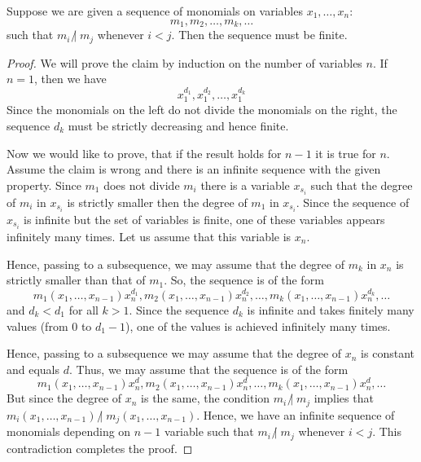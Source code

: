 \begin{claim}
Suppose we are given a sequence of monomials on variables $x_1,\ldots,x_n$:
\[
m_1,m_2,\ldots, m_k,\ldots
\]
such that $m_i \mathbin{\not|} m_j$ whenever $i < j$.
Then the sequence must be finite.
\end{claim}
\begin{proof}
We will prove the claim by induction on the number of variables $n$.
If $n = 1$, then we have
\[
x_1^{d_1}, x_1^{d_2},\ldots, x_1^{d_k}
\]
Since the monomials on the left do not divide the monomials on the right, the sequence $d_k$ must be strictly decreasing and hence finite.

Now we would like to prove, that if the result holds for $n-1$ it is true for $n$.
Assume the claim is wrong and there is an infinite sequence with the given property.
Since $m_1$ does not divide $m_i$ there is a variable $x_{s_i}$ such that the degree of $m_i$ in $x_{s_i}$ is strictly smaller then the degree of $m_1$ in $x_{s_i}$.
Since the sequence of $x_{s_i}$ is infinite but the set of variables is finite, one of these variables appears infinitely many times.
Let us assume that this variable is $x_n$.

Hence, passing to a subsequence, we may assume that the degree of $m_k$ in $x_n$ is strictly smaller than that of $m_1$.
So, the sequence is of the form
\[
m_1(x_1,\ldots,x_{n-1})x_n^{d_1}, m_2(x_1,\ldots,x_{n-1})x_n^{d_2},\ldots, m_k(x_1,\ldots,x_{n-1})x_n^{d_k}, \ldots
\]
and $d_k < d_1$ for all $k > 1$.
Since the sequence $d_k$ is infinite and takes finitely many values (from $0$ to $d_1-1$), one of the values is achieved infinitely many times.

Hence, passing to a subsequence we may assume that the degree of $x_n$ is constant and equals $d$.
Thus, we may assume that the sequence is of the form
\[
m_1(x_1,\ldots,x_{n-1})x_n^{d}, m_2(x_1,\ldots,x_{n-1})x_n^{d},\ldots, m_k(x_1,\ldots,x_{n-1})x_n^{d}, \ldots
\]
But since the degree of $x_n$ is the same, the condition $m_i\mathbin{\not |} m_j$ implies that $m_i(x_1,\ldots,x_{n-1})\mathbin{\not |} m_j(x_1,\ldots,x_{n-1})$.
Hence, we have an infinite sequence of monomials depending on $n-1$ variable such that $m_i\mathbin{\not |} m_j$ whenever $i < j$.
This contradiction completes the proof.
\end{proof}

